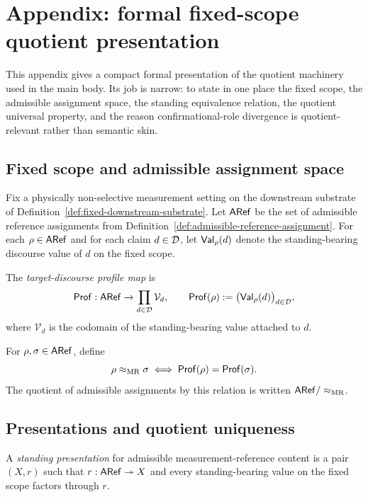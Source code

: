 \section{Appendix: formal fixed-scope quotient presentation}
\label{app:formal-quotient}

This appendix gives a compact formal presentation of the quotient machinery used in the main body.
Its job is narrow: to state in one place the fixed scope, the admissible assignment space, the standing
 equivalence relation, the quotient universal property, and the reason confirmational-role divergence is
quotient-relevant rather than semantic skin.

\subsection{Fixed scope and admissible assignment space}

Fix a physically non-selective measurement setting on the downstream substrate of
Definition~\ref{def:fixed-downstream-substrate}. Let $\mathsf{ARef}$ be the set of admissible reference
assignments from Definition~\ref{def:admissible-reference-assignment}. For each $\rho\in\mathsf{ARef}$ and
for each claim $d\in\mathcal{D}$, let $\mathsf{Val}_\rho(d)$ denote the standing-bearing discourse value of $d$ on the
fixed scope.

\begin{definition}
\label{def:profile-map-appendix}
The \emph{target-discourse profile map} is
\[
\mathsf{Prof}:\mathsf{ARef}\to \prod_{d\in\mathcal{D}} \mathcal V_d,
\qquad
\mathsf{Prof}(\rho):=\bigl(\mathsf{Val}_\rho(d)\bigr)_{d\in\mathcal{D}},
\]
where $\mathcal V_d$ is the codomain of the standing-bearing value attached to $d$.
\end{definition}

\begin{definition}
\label{def:standing-equivalence-appendix}
For $\rho,\sigma\in\mathsf{ARef}$, define
\[
\rho\mathrel{\approx_{\mathrm{MR}}}\sigma \iff \mathsf{Prof}(\rho)=\mathsf{Prof}(\sigma).
\]
The quotient of admissible assignments by this relation is written $\mathsf{ARef}/\mathrel{\approx_{\mathrm{MR}}}$.
\end{definition}

\subsection{Presentations and quotient uniqueness}

\begin{definition}
\label{def:standing-presentation-appendix}
A \emph{standing presentation} for admissible measurement-reference content is a pair $(X,r)$ such
that $r:\mathsf{ARef}\twoheadrightarrow X$ and every standing-bearing value on the fixed scope factors
through $r$.
\end{definition}

